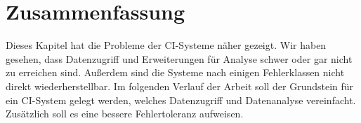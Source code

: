 \section{Zusammenfassung}

Dieses Kapitel hat die Probleme der CI-Systeme n\"aher gezeigt.
Wir haben gesehen, dass Datenzugriff und Erweiterungen f\"ur Analyse
schwer oder gar nicht zu erreichen sind.
Außerdem sind die Systeme nach einigen Fehlerklassen nicht direkt wiederherstellbar.
Im folgenden Verlauf der Arbeit soll der Grundstein f\"ur ein CI-System gelegt werden,
welches Datenzugriff und Datenanalyse vereinfacht.
Zus\"atzlich soll es eine bessere Fehlertoleranz aufweisen.


